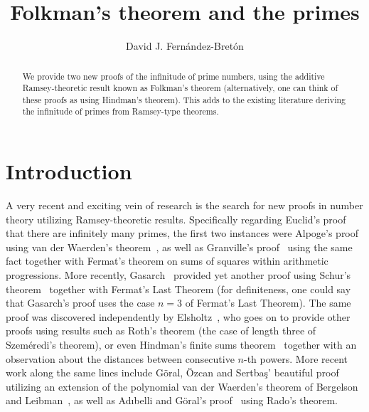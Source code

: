 \documentclass[10pt]{amsart}
\author[D. Fern\'andez]{David J. Fern\'andez-Bret\'on}
\title[Folkman's theorem and the primes]{Folkman's theorem and the primes}
\theoremstyle{definition}
\begin{document}
\begin{abstract}
We provide two new proofs of the infinitude of prime numbers, using the additive Ramsey-theoretic result known as Folkman's theorem (alternatively, one can think of these proofs as using Hindman's theorem). This adds to the existing literature deriving the infinitude of primes from Ramsey-type theorems.
\end{abstract}

\maketitle

\section{Introduction}

A very recent and exciting vein of research is the search for new proofs in number theory utilizing Ramsey-theoretic results. Specifically regarding Euclid's proof that there are infinitely many primes, the first two instances were Alpoge's proof~\cite{alpoge} using van der Waerden's theorem~\cite{vanderwaerden}, as well as Granville's proof~\cite{granville} using the same fact together with Fermat's theorem on sums of squares within arithmetic progressions. More recently, Gasarch~\cite{gasarch} provided yet another proof using Schur's theorem~\cite{schur} together with Fermat's Last Theorem (for definiteness, one could say that Gasarch's proof uses the case $n=3$ of Fermat's Last Theorem). The same proof was discovered independently by Elsholtz~\cite{elsholtz}, who goes on to provide other proofs using results such as Roth's theorem (the case of length three of Szeméredi's theorem), or even Hindman's finite sums theorem~\cite{hindman-thm} together with an observation about the distances between consecutive $n$-th powers. More recent work along the same lines include G\"oral, Özcan and Sertba\c{s}' beautiful proof~\cite{goral-et-al} utilizing an extension of the polynomial van der Waerden's theorem of Bergelson and Leibman~\cite{bergelson-leibman-setpoly}, as well as Ad{\i}belli and G\"oral's proof~\cite{adibelli-goral} using Rado's theorem.
\end{document}
